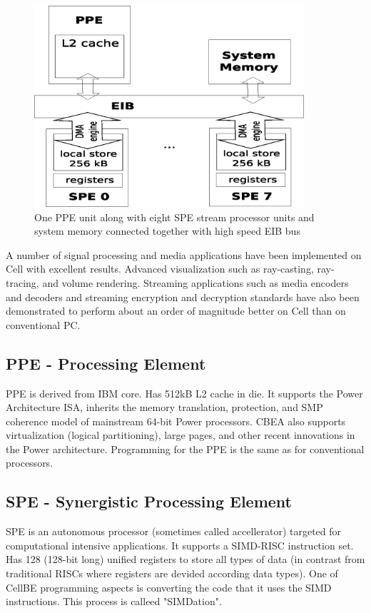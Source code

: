 \begin{figure}
    \centering
    \includegraphics[width=10cm]{data/cellLayout.eps}
    \caption[CellBE processor layout]{One PPE unit along with eight SPE stream processor units and system memory connected together with high speed EIB bus}
    \label{fg:processorLayout}
\end{figure}

A number of signal processing and media applications have been implemented on Cell with excellent results. Advanced visualization such as ray-casting, ray-tracing, and volume rendering. Streaming applications such as media encoders and decoders and streaming encryption and decryption standards have also been demonstrated to perform about an order of magnitude better on Cell than on conventional PC.

\subsection{PPE -  Processing Element}
PPE is derived from IBM  core. Has 512kB L2 cache in die. It supports the Power Architecture ISA, inherits the memory translation, protection, and SMP coherence model of mainstream 64-bit Power processors. CBEA also supports virtualization (logical partitioning), large pages, and other recent innovations in the Power architecture. Programming for the PPE is the same as for conventional processors.

\subsection{SPE - Synergistic Processing Element}
SPE is an autonomous processor (sometimes called accellerator) targeted for computational intensive applications. It supports a SIMD-RISC instruction set. Has 128 (128-bit long) unified registers to store all types of data (in contrast from traditional RISCs where registers are devided according data types). One of CellBE programming aspects is converting the code that it uses the SIMD instructions. This process is calleed "SIMDation".

